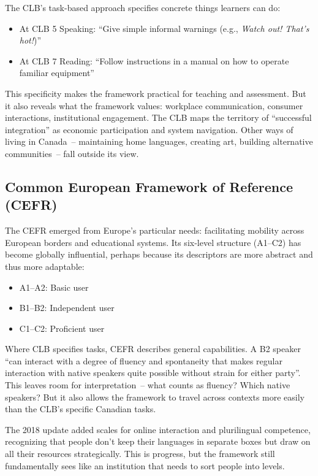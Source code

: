 The CLB's task-based approach specifies concrete things learners can do:

\begin{itemize}[noitemsep]
    \item At CLB 5 Speaking: ``Give simple informal warnings (e.g., \textit{Watch out! That's hot!})''
    \item At CLB 7 Reading: ``Follow instructions in a manual on how to operate familiar equipment''
\end{itemize}

This specificity makes the framework practical for teaching and assessment. But it also reveals what the framework values: workplace communication, consumer interactions, institutional engagement. The CLB maps the territory of ``successful integration'' as economic participation and system navigation. Other ways of living in Canada~-- maintaining home languages, creating art, building alternative communities~-- fall outside its view.

\subsection{Common European Framework of Reference (CEFR)}

The CEFR emerged from Europe's particular needs: facilitating mobility across European borders and educational systems. Its six-level structure (A1--C2) has become globally influential, perhaps because its descriptors are more abstract and thus more adaptable:

\begin{itemize}[noitemsep]
\item A1--A2: Basic user
\item B1--B2: Independent user
\item C1--C2: Proficient user
\end{itemize}

Where CLB specifies tasks, CEFR describes general capabilities. A B2 speaker ``can interact with a degree of fluency and spontaneity that makes regular interaction with native speakers quite possible without strain for either party''. This leaves room for interpretation~-- what counts as fluency? Which native speakers? But it also allows the framework to travel across contexts more easily than the CLB's specific Canadian tasks.

The 2018 update added scales for online interaction and plurilingual competence, recognizing that people don't keep their languages in separate boxes but draw on all their resources strategically. This is progress, but the framework still fundamentally sees like an institution that needs to sort people into levels.

